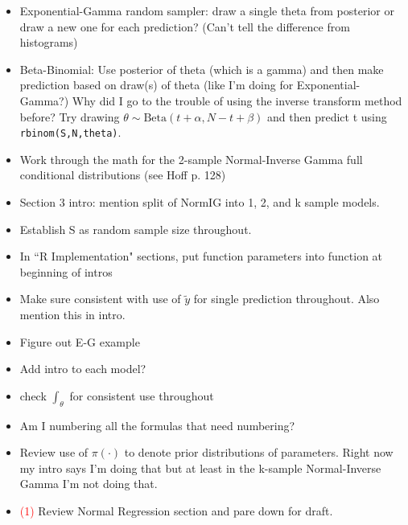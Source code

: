 \documentclass[12pt, a4paper]{article}
\begin{document}
\begin{itemize}
  \item Exponential-Gamma random sampler:  draw a single theta from posterior or draw a new one for each prediction?  (Can't tell the difference from histograms)
  \item Beta-Binomial:  Use posterior of theta (which is a gamma) and then make prediction based on draw(s) of theta (like I'm doing for Exponential-Gamma?)  Why did I go to the trouble of using the inverse transform method before?  Try drawing $\theta\sim\text{Beta}(t+\alpha,N-t+\beta)$ and then predict t using \texttt{rbinom(S,N,theta)}.
  \item Work through the math for the 2-sample Normal-Inverse Gamma full conditional distributions (see Hoff p. 128)
  \item Section 3 intro:  mention split of NormIG into 1, 2, and k sample models.
  \item Establish S as random sample size throughout.
  \item In ``R Implementation" sections, put function parameters into function at beginning of intros
  \item Make sure consistent with use of $\tilde{y}$ for single prediction throughout.  Also mention this in intro.
  \item Figure out E-G example
  \item Add intro to each model?
  \item check $\int_\theta$ for consistent use throughout
  \item Am I numbering all the formulas that need numbering?
  \item Review use of $\pi(\cdot)$ to denote prior distributions of parameters.  Right now my intro says I'm doing that but at least in the k-sample Normal-Inverse Gamma I'm not doing that.
  \item \textcolor{red}{(1)} Review Normal Regression section and pare down for draft.
\end{itemize}
\end{document}
